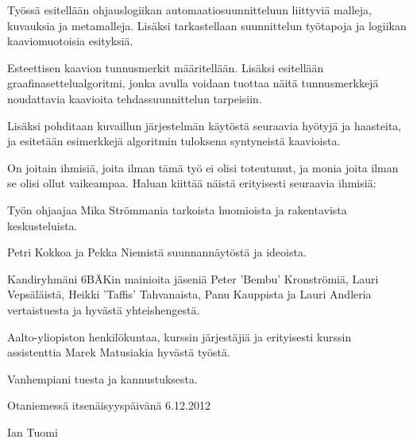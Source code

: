 \documentclass[finnish,12pt]{article}
\author{Ian Tuomi}{}
\date{6.12.2012}
\begin{document}
	 \makecoverpage

	\begin{abstractpage}[finnish]
Työssä esitellään ohjauslogiikan automaatiosuunnitteluun liittyviä malleja, kuvauksia ja metamalleja.
Lisäksi tarkastellaan suunnittelun työtapoja ja logiikan kaaviomuotoisia esityksiä.

Esteettisen kaavion tunnusmerkit määritellään. Lisäksi esitellään graafinasettelualgoritmi, jonka avulla voidaan tuottaa näitä tunnusmerkkejä noudattavia kaavioita tehdassuunnittelun tarpeisiin.

Lisäksi pohditaan kuvaillun järjestelmän käytöstä seuraavia hyötyjä ja haasteita, ja esitetään esimerkkejä algoritmin tuloksena syntyneistä kaavioista.

	\end{abstractpage}

	\newpage


On joitain ihmisiä, joita ilman tämä työ ei olisi toteutunut, ja monia joita ilman se olisi ollut vaikeampaa.
Haluan kiittää näistä erityisesti seuraavia ihmisiä:

Työn ohjaajaa Mika Strömmania tarkoista huomioista ja rakentavista keskusteluista.

Petri Kokkoa ja Pekka Niemistä suunnannäytöstä ja ideoista.

Kandiryhmäni 6BÄKin mainioita jäseniä
Peter 'Bembu' Kronströmiä,
Lauri Vepsäläistä,
Heikki 'Taffis' Tahvanaista,
Panu Kauppista
ja Lauri Andleria
vertaistuesta ja hyvästä yhteishengestä.

Aalto-yliopiston henkilökuntaa, kurssin järjestäjiä ja erityisesti kurssin assistenttia Marek Matusiakia hyvästä työstä.

Vanhempiani tuesta ja kannustuksesta.

	\vspace{5cm}

Otaniemessä itsenäisyyspäivänä 6.12.2012

\vspace{1mm}
	{\hfill Ian Tuomi \hspace{1cm}}

	\newpage

	\tableofcontents



\end{document}

